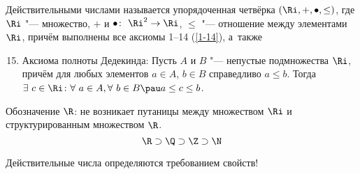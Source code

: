 
Действительными числами называется упорядоченная четвёрка $(\Ri,+,\bullet,\leq)$, где $\Ri$ "--- множество,
 $+$ и $\bullet\colon\ \Ri^2\to\Ri$, $\leq$ "--- отношение между элементами $\Ri$, причём выполнены все аксиомы 1--14 (\ref{1-14}), а~также
\begin{enumerate}\setcounter{enumi}{14}\renewcommand{\theenumi}{$\arabic{enumi}$}
\item \label{dedeking} Аксиома полноты Дедекинда: Пусть $A$ и $B$ "--- непустые подмножества $\Ri$, причём для любых элементов $a\in A$, $b\in B$ справедливо $a\leq b$. Тогда $\exists\  c\in \Ri\colon\forall\  a\in A,\forall\  b\in B\pau a\leq c\leq b$.
\end{enumerate}

 Обозначение $\R$: не возникает путаницы между множеством $\Ri$ и структурированным множеством $\R$.
 \[
    \R\supset\Q\supset\Z\supset\N
 \]

Действительные числа определяются требованием свойств!
